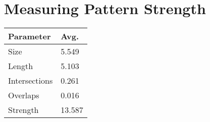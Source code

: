 \section{Measuring Pattern Strength} \label{sec:patternStrength}

  \begin{table}[H]
    \begin{tabular}{ l | l }
      \hline
      {\bf Parameter} & {\bf Avg.} \\ \hline
      Size & 5.549 \\ 
      Length & 5.103 \\
      Intersections & 0.261 \\ %
      Overlaps & 0.016 \\ %
      Strength & 13.587 \\ \hline
    \end{tabular}
  \end{table}

